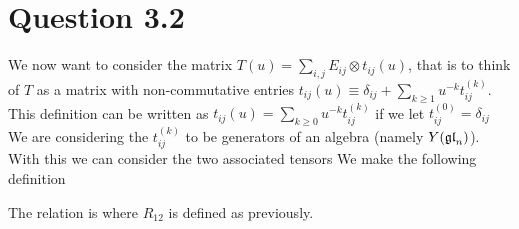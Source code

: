 \documentclass{article}
\begin{document}
\section{Question 3.2}

We now want to consider the matrix $T(u) = \sum_{i,j} E_{ij} \otimes t_{ij}(u)$, that is to think of $T$ as a matrix with non-commutative entries $t_{ij}(u) \equiv \delta_{ij} + \sum_{k \geq 1} u^{-k} t_{ij}^{(k)}$. This definition can be written as $t_{ij}(u) = \sum_{k \geq 0} u^{-k} t_{ij}^{(k)}$ if we let $t_{ij}^{(0)} = \delta_{ij}$ We are considering the $t_{ij}^{(k)}$ to be generators of an algebra (namely $Y(\mathfrak{gl}_n)$). With this we can consider the two associated tensors 
We make the following definition
\begin{definition}
The  relation is 
where $R_{12}$ is defined as previously.   
\end{definition}
\end{document}
